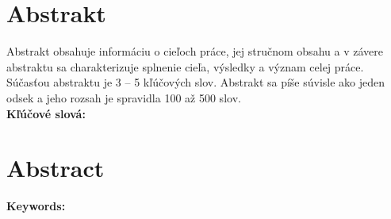 \thispagestyle{empty}
\section*{Abstrakt}
Abstrakt obsahuje informáciu o cieľoch práce, jej stručnom obsahu a v závere abstraktu sa charakterizuje splnenie cieľa, výsledky a význam celej práce. Súčasťou abstraktu je 3 – 5 kľúčových slov. Abstrakt sa píše súvisle ako jeden odsek a jeho rozsah je spravidla 100 až 500 slov. \\
\textbf{Kľúčové slová:}
\emptypage

\thispagestyle{empty}
\section*{Abstract}

\textbf{Keywords:}
\emptypage 